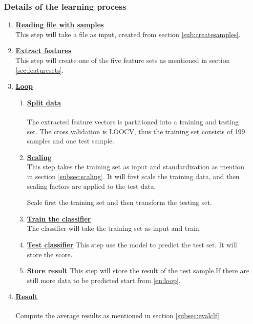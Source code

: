 \documentclass[USenglish]{ifimaster}  %
\begin{document}
	\subsubsection{Details of the learning process}
	\begin{enumerate}
		\item \textbf{\underline{Reading file with samples}}
		\\
		This step will take a file as input, created from section \ref{sub:createsamples}.
		
		\item \textbf{\underline{Extract features}}
		\\
		This step will create one of the five feature sets as mentioned in section \ref{sec:featuresets}.
		
		\item \textbf{\underline{Loop}}
		
		\begin{enumerate} 
			\item \textbf{\underline{Split data}} \label{en:loop}
			\\
			\\
			The extracted feature vectors is partitioned into a training and testing set. The cross validation is LOOCV, thus the training set consists of 199 samples and one test sample.
			
			
			\item \textbf{\underline{Scaling}}
			\\
			This step takes the training set as input and standardization as mention in section \ref{subsec:scaling}. It will first scale the training data, and then scaling factors are applied to the test data.
			
			Scale first the training set and then transform the testing set.
			\item \textbf{\underline{Train the classifier}}
			\\
			The classifier will take the training set as input and train.
			
			\item \textbf{\underline{Test classifier}} This step use the model to predict the test set. It will store the score.
			
			
			\item \textbf{\underline{Store result}} This step will store the result of the test sample.If there are still more data to be predicted start from \ref{en:loop}.
			
		\end{enumerate}
		
		
		\item \textbf{\underline{Result}}
		\\
		\\
		Compute the average results as mentioned in section \ref{subsec:evalclf} 
	\end{enumerate}
	
\end{document}
